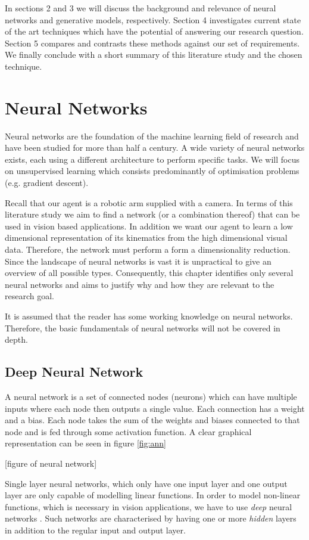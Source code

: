 \documentclass[main.tex]{subfiles}
\begin{document}
In sections 2 and 3 we will discuss the background and relevance of neural networks and generative models, respectively. Section 4 investigates current state of the art techniques which have the potential of answering our research question. Section 5 compares and contrasts these methods against our set of requirements. We finally conclude with a short summary of this literature study and the chosen technique.

\chapter{Neural Networks}
Neural networks are the foundation of the machine learning field of research and have been studied for more than half a century. A wide variety of neural networks exists, each using a different architecture to perform specific tasks. We will focus on unsupervised learning which consists predominantly of optimisation problems (e.g. gradient descent).  

Recall that our agent is a robotic arm supplied with a camera. In terms of this literature study we aim to find a network (or a combination thereof) that can be used in vision based applications. In addition we want our agent to learn a low dimensional representation of its kinematics from the high dimensional visual data. Therefore, the network  must perform a form a dimensionality reduction. Since the landscape of neural networks is vast it is unpractical to give an overview of all possible types. Consequently, this chapter identifies only several neural networks and aims to justify why and how they are relevant to the research goal.

It is assumed that the reader has some working knowledge on neural networks. Therefore, the basic fundamentals of neural networks will not be covered in depth.

\section{Deep Neural Network}
A neural network is a set of connected nodes (neurons) which can have multiple inputs where each node then outputs a single value. Each connection has a weight and a bias. Each node takes the sum of the weights and biases connected to that node and is fed through some activation function. A clear graphical representation can be seen in figure \ref{fig:ann}

[figure of neural network]

Single layer neural networks, which only have one input layer and one output layer are only capable of modelling linear functions. In order to model non-linear functions, which is necessary in vision applications, we have to use \textit{deep} neural networks \cite{LeCun2015}. Such networks are characterised by having one or more \textit{hidden} layers in addition to the regular input and output layer.
\end{document}
